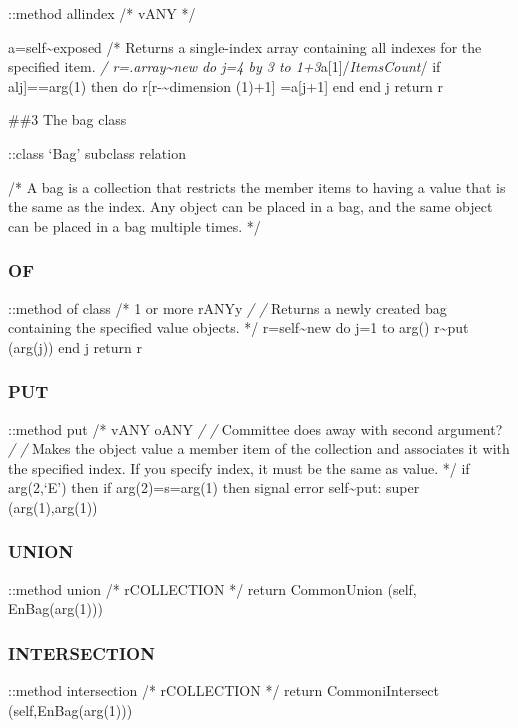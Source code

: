 ::method allindex /* vANY */

a=self\textasciitilde exposed /* Returns a single-index array containing
all indexes for the specified item. \emph{/ r=.array\textasciitilde new
do j=4 by 3 to 1+3}a{[}1{]}/\emph{ItemsCount}/ if alj{]}==arg(1) then do
r{[}r-\textasciitilde dimension (1)+1{]} =a{[}j+1{]} end end j return r

\#\#3 The bag class

::class `Bag' subclass relation

/* A bag is a collection that restricts the member items to having a
value that is the same as the index. Any object can be placed in a bag,
and the same object can be placed in a bag multiple times. */

\hypertarget{of-2}{%
\subsubsection{OF}\label{of-2}}

::method of class /* 1 or more rANYy \emph{/ /} Returns a newly created
bag containing the specified value objects. */ r=self\textasciitilde new
do j=1 to arg() r\textasciitilde put (arg(j)) end j return r

\hypertarget{put-4}{%
\subsubsection{PUT}\label{put-4}}

::method put /* vANY oANY \emph{/ /} Committee does away with second
argument? \emph{/ /} Makes the object value a member item of the
collection and associates it with the specified index. If you specify
index, it must be the same as value. */ if arg(2,`E') then if
arg(2)=s=arg(1) then signal error self\textasciitilde put: super
(arg(1),arg(1))

\hypertarget{union-2}{%
\subsubsection{UNION}\label{union-2}}

::method union /* rCOLLECTION */ return CommonUnion (self,
EnBag(arg(1)))

\hypertarget{intersection-3}{%
\subsubsection{INTERSECTION}\label{intersection-3}}

::method intersection /* rCOLLECTION */ return CommoniIntersect
(self,EnBag(arg(1)))

